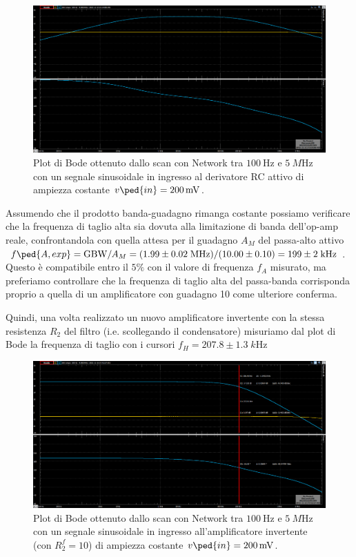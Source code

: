 \documentclass[10pt,a4paper]{article}
\begin{document}
\begin{figure}[htbp]
\centering
\includegraphics[scale=0.36]{hpfbode}
\caption{Plot di Bode ottenuto dallo scan con Network tra $\SI{100}{\Hz}$ e
$\SI{5}{M\Hz}$ con un segnale sinusoidale in ingresso al derivatore RC attivo
di ampiezza costante $v\ped{in} = \SI{200}{m\V}$.
\label{fig: derbode}}
\end{figure}

Assumendo che il prodotto banda-guadagno rimanga costante possiamo verificare
che la frequenza di taglio alta sia dovuta alla limitazione di banda
dell'op-amp reale, confrontandola con quella attesa per il guadagno $A_M$ del
passa-alto attivo
$f\ped{A, exp} = \mathrm{GBW}/A_M
= (1.99 \pm 0.02 \; \si{M\Hz})/(10.00 \pm 0.10) = 199 \pm 2 \; \si{k\Hz}$.
Questo è compatibile entro il $5\%$ con il valore di frequenza $f_A$ misurato,
ma preferiamo controllare che la frequenza di taglio alta del passa-banda
corrisponda proprio a quella di un amplificatore con guadagno 10 come ulteriore
conferma.

Quindi, una volta realizzato un nuovo amplificatore invertente con la
stessa resistenza $R_2$ del filtro (i.e. scollegando il condensatore)
misuriamo dal plot di Bode la frequenza di taglio con i cursori
$f_H = 207.8 \pm 1.3 \; \si{k\Hz}$
\begin{figure}[htbp]
\centering
\includegraphics[scale=0.36]{ampinv10}
\caption{Plot di Bode ottenuto dallo scan con Network tra $\SI{100}{\Hz}$ e
$\SI{5}{M\Hz}$ con un segnale sinusoidale in ingresso all'amplificatore
invertente (con $R_2^f=10$) di ampiezza costante $v\ped{in} = \SI{200}{m\V}$.
\label{fig: ampinv10}}
\end{figure}
\end{document}
